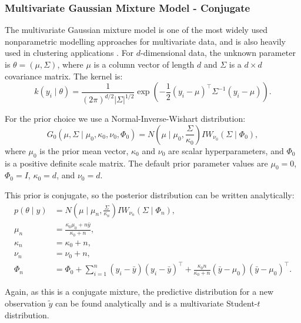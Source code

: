 \documentclass[nojss]{jss}
\begin{document}
\subsubsection{Multivariate Gaussian Mixture Model - Conjugate}

The multivariate Gaussian mixture model is one of the most widely used nonparametric modelling
approaches for multivariate data, and is also heavily used in clustering applications
\citep{maceachern_estimating_1998}. For $d$-dimensional data, the unknown parameter is
$\theta = (\mu, \Sigma)$, where $\mu$ is a column vector of length $d$ and $\Sigma$ is a
$d \times d$ covariance matrix. The kernel is:
\begin{equation*}
k(y_i \mid \theta) = \frac{1}{(2\pi)^{d/2} |\Sigma|^{1/2}}
\exp \left( -\frac{1}{2} (y_i - \mu)^\top \Sigma^{-1} (y_i - \mu) \right).
\end{equation*}

For the prior choice we use a Normal-Inverse-Wishart distribution:
\begin{equation*}
G_0(\mu, \Sigma \mid \mu_0, \kappa_0, \nu_0, \Phi_0)
=
N \left( \mu \mid \mu_0, \frac{\Sigma}{\kappa_0} \right)
IW_{\nu_0}(\Sigma \mid \Phi_0),
\end{equation*}
where $\mu_0$ is the prior mean vector, $\kappa_0$ and $\nu_0$ are scalar hyperparameters,
and $\Phi_0$ is a positive definite scale matrix. The default prior parameter values are
$\mu_0 = 0$, $\Phi_0 = I$, $\kappa_0 = d$, and $\nu_0 = d$.

This prior is conjugate, so the posterior distribution can be written analytically:
\begin{align*}
p(\theta \mid y)
&=
N \left( \mu \mid \mu_n, \frac{\Sigma}{\kappa_n} \right)
IW_{\nu_n}(\Sigma \mid \Phi_n), \\
\mu_n
&=
\frac{\kappa_0 \mu_0 + n \bar{y}}{\kappa_0 + n}, \\
\kappa_n
&=
\kappa_0 + n, \\
\nu_n
&=
\nu_0 + n, \\
\Phi_n
&=
\Phi_0 +
\sum_{i=1}^n (y_i - \bar{y})(y_i - \bar{y})^\top +
\frac{\kappa_0 n}{\kappa_0 + n}(\bar{y} - \mu_0)(\bar{y} - \mu_0)^\top.
\end{align*}

Again, as this is a conjugate mixture, the predictive distribution for a new observation
$\tilde{y}$ can be found analytically and is a multivariate Student-$t$ distribution.
\end{document}
